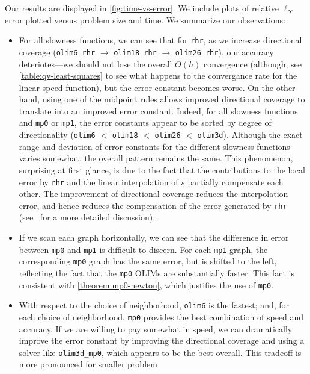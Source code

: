 \documentclass[sisc-eikonal.tex]{subfiles}
\begin{document}
Our results are displayed in \cref{fig:time-vs-error}. We include
plots of relative $\ell_\infty$ error plotted versus problem size and
time. We summarize our observations:
\begin{itemize}
\item For all slowness functions, we can see that for \texttt{rhr}, as
  we increase directional coverage (\texttt{olim6\_rhr} $\to$
  \texttt{olim18\_rhr} $\to$ \texttt{olim26\_rhr}), our accuracy
  deteriotes---we should not lose the overall $O(h)$ convergence
  (although, see \cref{table:qv-least-squares} to see what happens to
  the convergance rate for the linear speed function), but the error
  constant becomes worse. On the other hand, using one of the midpoint
  rules allows improved directional coverage to translate into an
  improved error constant. Indeed, for all slowness functions and
  \texttt{mp0} or \texttt{mp1}, the error constants appear to be
  sorted by degree of directionality (\texttt{olim6} $<$
  \texttt{olim18} $<$ \texttt{olim26} $<$ \texttt{olim3d}). Although
  the exact range and deviation of error constants for the different
  slowness functions varies somewhat, the overall pattern remains the
  same. This phenomenon, surprising at first glance, is due to the
  fact that the contributions to the local error by \texttt{rhr} and
  the linear interpolation of $s$ partially compensate each other. The
  improvement of directional coverage reduces the interpolation error,
  and hence reduces the compensation of the error generated by
  \texttt{rhr} (see~\cite{yang2019computing} for a more detailed
  discussion).
\item If we scan each graph horizontally, we can see that the
  difference in error between \texttt{mp0} and \texttt{mp1} is
  difficult to discern. For each \texttt{mp1} graph, the corresponding
  \texttt{mp0} graph has the same error, but is shifted to the left,
  reflecting the fact that the \texttt{mp0} OLIMs are substantially
  faster. This fact is consistent with \cref{theorem:mp0-newton}, which
  justifies the use of \texttt{mp0}.
\item With respect to the choice of neighborhood, \texttt{olim6} is
  the fastest; and, for each choice of neighborhood, \texttt{mp0}
  provides the best combination of speed and accuracy. If we are
  willing to pay somewhat in speed, we can dramatically improve the
  error constant by improving the directional coverage and using a
  solver like \texttt{olim3d\_mp0}, which appears to be the best
  overall. This tradeoff is more pronounced for smaller problem

\end{itemize}
\end{document}
